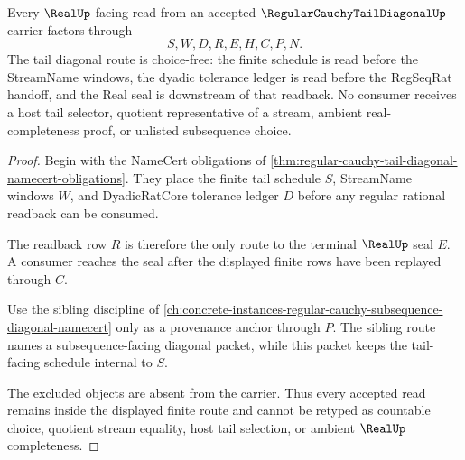 \begin{theorem}
\label{thm:regular-cauchy-tail-diagonal-choice-free-route}
Every $\RealUp$-facing read from an accepted $\RegularCauchyTailDiagonalUp$ carrier factors through
$$
S,W,D,R,E,H,C,P,N .
$$
The tail diagonal route is choice-free: the finite schedule is read before the StreamName windows, the dyadic tolerance ledger is read before the RegSeqRat handoff, and the Real seal is downstream of that readback. No consumer receives a host tail selector, quotient representative of a stream, ambient real-completeness proof, or unlisted subsequence choice.
\end{theorem}
\begin{proof}
Begin with the NameCert obligations of \autoref{thm:regular-cauchy-tail-diagonal-namecert-obligations}. They place the finite tail schedule $S$, StreamName windows $W$, and DyadicRatCore tolerance ledger $D$ before any regular rational readback can be consumed.

The readback row $R$ is therefore the only route to the terminal $\RealUp$ seal $E$. A consumer reaches the seal after the displayed finite rows have been replayed through $C$.

Use the sibling discipline of \autoref{ch:concrete-instances-regular-cauchy-subsequence-diagonal-namecert} only as a provenance anchor through $P$. The sibling route names a subsequence-facing diagonal packet, while this packet keeps the tail-facing schedule internal to $S$.

The excluded objects are absent from the carrier. Thus every accepted read remains inside the displayed finite route and cannot be retyped as countable choice, quotient stream equality, host tail selection, or ambient $\RealUp$ completeness.
\end{proof}


